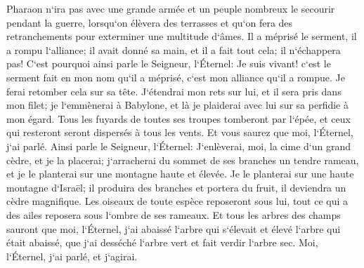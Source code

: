 \verse Pharaon n`ira pas avec une grande armée et un peuple nombreux le secourir pendant la guerre, lorsqu`on élèvera des terrasses et qu`on fera des retranchements pour exterminer une multitude d`âmes. 
\verse Il a méprisé le serment, il a rompu l`alliance; il avait donné sa main, et il a fait tout cela; il n`échappera pas! 
\verse C`est pourquoi ainsi parle le Seigneur, l`Éternel: Je suis vivant! c`est le serment fait en mon nom qu`il a méprisé, c`est mon alliance qu`il a rompue. Je ferai retomber cela sur sa tête. 
\verse J`étendrai mon rets sur lui, et il sera pris dans mon filet; je l`emmènerai à Babylone, et là je plaiderai avec lui sur sa perfidie à mon égard. 
\verse Tous les fuyards de toutes ses troupes tomberont par l`épée, et ceux qui resteront seront dispersés à tous les vents. Et vous saurez que moi, l`Éternel, j`ai parlé. 
\verse Ainsi parle le Seigneur, l`Éternel: J`enlèverai, moi, la cime d`un grand cèdre, et je la placerai; j`arracherai du sommet de ses branches un tendre rameau, et je le planterai sur une montagne haute et élevée. 
\verse Je le planterai sur une haute montagne d`Israël; il produira des branches et portera du fruit, il deviendra un cèdre magnifique. Les oiseaux de toute espèce reposeront sous lui, tout ce qui a des ailes reposera sous l`ombre de ses rameaux. 
\verse Et tous les arbres des champs sauront que moi, l`Éternel, j`ai abaissé l`arbre qui s`élevait et élevé l`arbre qui était abaissé, que j`ai desséché l`arbre vert et fait verdir l`arbre sec. Moi, l`Éternel, j`ai parlé, et j`agirai. 

\chapter{}

